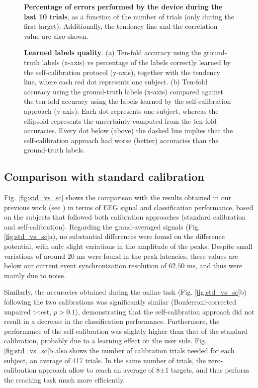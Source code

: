 \begin{figure*}[!ht]
		\centering	
		\caption{\label{fig:percentage_errors} \textbf{Percentage of errors performed by the device during the last 10 trials}, as a function of the number of trials (only during the first target). Additionally, the tendency line and the correlation value are also shown.}	
\end{figure*}


\begin{figure*}[!htbp]
\centering
\caption{\textbf{Learned labels quality}. (a) Ten-fold accuracy using the ground-truth labels (x-axis) vs percentage of the labels correctly learned by the self-calibration protocol (y-axis), together with the tendency line, where each red dot represents one subject. (b) Ten-fold accuracy using the ground-truth labels (x-axis) compared against the ten-fold accuracy using the labels learned by the self-calibration approach (y-axis). Each dot represents one subject, whereas the ellipsoid represents the uncertainty computed from the ten-fold accuracies. Every dot below (above) the dashed line implies that the self-calibration approach had worse (better) accuracies than the ground-truth labels.}
\label{fig:labels}
\end{figure*}

\subsection{Comparison with standard calibration}

Fig. \ref{fig:std_vs_sc} shows the comparison with the results obtained in our previous work (see \cite{iturrate13}) in terms of EEG signal and classification performance, based on the subjects that followed both calibration approaches (standard calibration and self-calibration). Regarding the grand-averaged signals (Fig. \ref{fig:std_vs_sc}a), no substantial differences were found on the difference potential, with only slight variations in the amplitude of the peaks. Despite small variations of around 20 ms were found in the peak latencies, these values are below our current event synchronization resolution of $62.50$ ms, and thus were mainly due to noise.

Similarly, the accuracies obtained during the online task (Fig. \ref{fig:std_vs_sc}b) following the two calibrations was significantly similar (Bonferroni-corrected unpaired t-test, $p>0.1$), demonstrating that the self-calibration approach did not result in a decrease in the classification performance. Furthermore, the performance of the self-calibration was slightly higher than that of the standard calibration, probably due to a learning effect on the user side. Fig.  \ref{fig:std_vs_sc}b also shows the number of calibration trials needed for each subject, an average of 417 trials. In the same number of trials, the zero-calibration approach allow to reach an average of 8$\pm$1 targets, and thus perform the reaching task much more efficiently.

